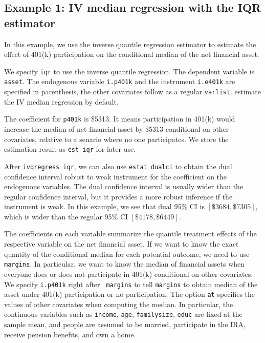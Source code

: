 \subsection{Example 1: IV median regression with the IQR estimator} 
In this example, we use the inverse quantile regression estimator 
to estimate the effect of 401(k) participation on the conditional median of the
net financial asset. 

\begin{stlog}

\end{stlog}

\begin{stlog}

\end{stlog}

We specify {\tt iqr} to use the inverse quantile regression. The dependent
variable is {\tt asset}. The endogenous variable {\tt i.p401k} and the
instrument {\tt i.e401k} are specified in parenthesis, the other
covariates follow as a regular {\tt varlist}. 
{\ivqreg} estimate the IV median regression by default. 


The coefficient for {\tt p401k} is \$5313. It means participation in 401(k)
would increase the median of net financial asset by \$5313 conditional on other
covariates, relative to a senario where no one participates.
We store the estimation result as {\tt est\_iqr} for later use.

After {\tt ivqregress iqr}, we can also use {\tt estat dualci} to obtain the
dual confidence interval robust to weak instrument for the coefficient on the
endogenous variables. The dual confidence interval is usually wider than the
regular confidence interval, but it provides a more robust inference if the
instrument is weak. In this example, we see that dual 95\% CI is $[\$3684,
\$7305]$, which is wider than the regular 95\% CI $[\$4178, \$6449]$.

\begin{stlog}

\end{stlog}

The coefficients on each variable summarize the quantile treatment effects of
the respective variable on the net financial asset. If we want to know
the exact quantity of the conditional median for each potential outcome,
we need to use {\tt margins}. In particular, we want to know the median of
financial assets when everyone does or does not participate in 401(k)
conditional on other covariates. We specify {\tt i.p401k} right after {\tt
margins} to tell {\tt margins} to obtain median of the asset under 401(k)
participation or no participation. The option {\tt at} specifies the values of
other covariates when computing the median. In particular, the continuous
variables such as {\tt income}, {\tt age}, {\tt familysize}, {\tt educ} are
fixed at the sample mean, and people are assumed to be married, participate in
the IRA, receive pension benefits, and own a home.

